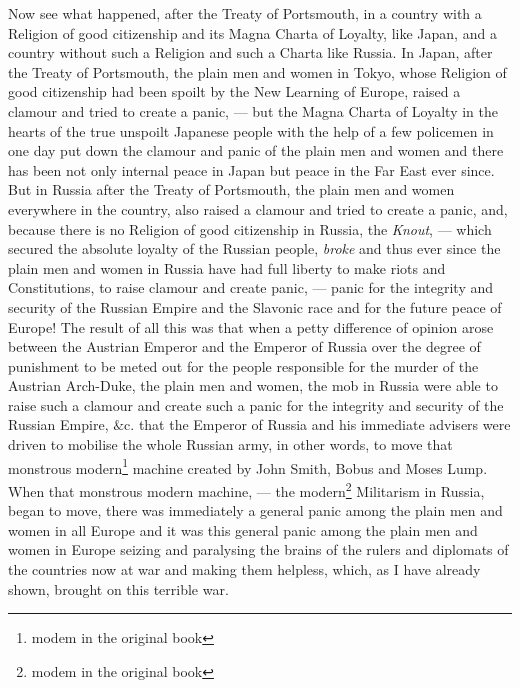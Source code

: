 Now see what happened, after the Treaty of Portsmouth, in a country with a Religion of good citizenship and its Magna Charta of Loyalty, like Japan, and a country without such a Religion and such a Charta like Russia.
In Japan, after the Treaty of Portsmouth, the plain men and women in Tokyo, whose Religion of good citizenship had been spoilt by the New Learning of Europe, raised a clamour and tried to create a panic, --- but the Magna Charta of Loyalty in the hearts of the true unspoilt Japanese people with the help of a few policemen in one day put down the clamour and panic of the plain men and women and there has been not only internal peace in Japan but peace in the Far East ever since\cite{num28}. 
But in Russia after the Treaty of Portsmouth, the plain men and women everywhere in the country, also raised a clamour and tried to create a panic, and, because there is no Religion of good citizenship in Russia, the \emph{Knout}, --- which secured the absolute loyalty of the Russian people, \emph{broke} and thus ever since the plain men and women in Russia have had full liberty to make riots and Constitutions, to raise clamour and create panic, --- panic for the integrity and security of the Russian Empire and the Slavonic race and for the future peace of Europe!
The result of all this was that when a petty difference of opinion arose between the Austrian Emperor and the Emperor of Russia over the degree of punishment to be meted out for the people responsible for the murder of the Austrian Arch-Duke, the plain men and women, the mob in Russia were able to raise such a clamour and create such a panic for the integrity and security of the Russian Empire, $\&$c. that the Emperor of Russia and his immediate advisers were driven to mobilise the whole Russian army, in other words, to move that monstrous modern\footnote{modem in the original book} machine created by John Smith, Bobus and Moses Lump. 
When that monstrous modern machine, --- the modern\footnote{modem in the original book} Militarism in Russia, began to move, there was immediately a general panic among the plain men and women in all Europe and it was this general panic among the plain men and women in Europe seizing and paralysing the brains of the rulers and diplomats of the countries now at war and making them helpless, which, as I have already shown, brought on this terrible war.

